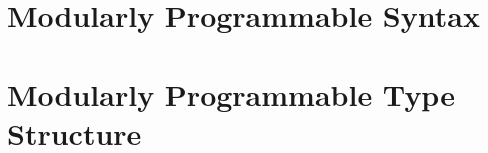 \documentclass[12pt]{cmuthesis}
\newcommand{\todolater}[1]{{\color{magenta} TODO (Later): #1}}
\newcommand{\todo}[1]{{\color{red} TODO: #1}}
\begin{document}
\tableofcontents
\listoffigures

\mainmatter



%
%
%
%
%






\part{Modularly Programmable Syntax}\label{part:syntax}





\part{Modularly Programmable Type Structure}\label{part:metamodules}


\end{document}
